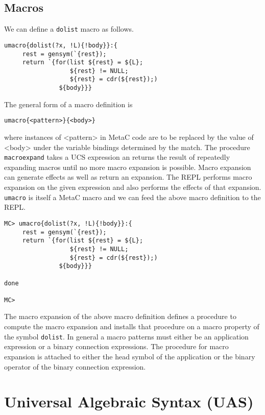 \documentclass{article}
\begin{document}
\subsection{Macros}

We can define a {\tt dolist} macro as follows.

\begin{verbatim}
umacro{dolist(?x, !L){!body}}:{
     rest = gensym(`{rest});
     return `{for(list ${rest} = ${L};
                  ${rest} != NULL;
                  ${rest} = cdr(${rest});)
               ${body}}}
\end{verbatim}

The general form of a macro definition is
\begin{verbatim}
umacro{<pattern>}{<body>}
\end{verbatim}
where instances of <pattern> in MetaC code are to be replaced by the value of <body> under the variable bindings determined by the match.  The procedure {\tt macroexpand} takes a UCS expression
an returns the result of repeatedly expanding macros until no more macro expansion is possible.  Macro expansion can generate effects as well as return an expansion.  The REPL performs
macro expansion on the given expression and also performs the effects of that expansion.  {\tt umacro} is itself a MetaC macro and we can feed the above macro definition to the REPL.

\begin{verbatim}
MC> umacro{dolist(?x, !L){!body}}:{
     rest = gensym(`{rest});
     return `{for(list ${rest} = ${L};
                  ${rest} != NULL;
                  ${rest} = cdr(${rest});)
               ${body}}}

done

MC>
\end{verbatim}

The macro expansion of the above macro definition defines a procedure to compute the macro expansion and installs that procedure on a macro property of the symbol {\tt dolist}.
In general a macro patterns must either be an application expression or a binary connection expressions.  The procedure for macro expansion is attached to either the head symbol of the application
or the binary operator of the binary connection expression.

\section{Universal Algebraic Syntax (UAS)}
\end{document}

